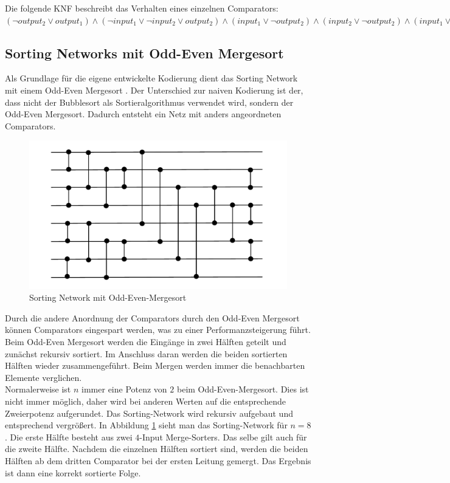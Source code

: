 \documentclass[a4,abstract=on]{scrartcl}
\begin{document}
Die folgende KNF beschreibt das Verhalten eines einzelnen Comparators:\\
$(\neg output_2 \vee output_1) \wedge (\neg input_1 \vee \neg input_2 \vee output_2) \wedge (input_1 \vee \neg output_2) \wedge (input_2 \vee \neg output_2) \wedge (input_1 \vee input_2 \vee \neg output_1) \wedge (\neg input_1 \vee output_1) \wedge (\neg input_2 \vee output_1)$

	\subsection{Sorting Networks mit Odd-Even Mergesort}
Als Grundlage für die eigene entwickelte Kodierung dient das Sorting Network mit einem Odd-Even Mergesort \cite[vgl.][]{odd-even}. Der Unterschied zur naiven Kodierung ist der, dass nicht der Bubblesort als Sortieralgorithmus verwendet wird, sondern der Odd-Even Mergesort. Dadurch entsteht ein Netz mit anders angeordneten Comparators.

\begin{figure}[H]
\centering
\includegraphics[width=\textwidth]{sorting_network_odd_even.pdf}
\caption{Sorting Network mit Odd-Even-Mergesort}
\label{fig:odd-even-mergesort}
\end{figure}

Durch die andere Anordnung der Comparators durch den Odd-Even Mergesort können Comparators eingespart werden, was zu einer Performanzsteigerung führt. Beim Odd-Even Mergesort werden die Eingänge in zwei Hälften geteilt und zunächst rekursiv sortiert. Im Anschluss daran werden die beiden sortierten Hälften wieder zusammengeführt. Beim Mergen werden immer die benachbarten Elemente verglichen.\\
Normalerweise ist $n$ immer eine Potenz von $2$ beim Odd-Even-Mergesort. Dies ist nicht immer möglich, daher wird bei anderen Werten auf die entsprechende Zweierpotenz aufgerundet. Das Sorting-Network wird rekursiv aufgebaut und entsprechend vergrößert. In Abbildung \ref{fig:odd-even-mergesort} sieht man das Sorting-Network für $n=8$. Die erste Hälfte besteht aus zwei $4$-Input Merge-Sorters. Das selbe gilt auch für die zweite Hälfte. Nachdem die einzelnen Hälften sortiert sind, werden die beiden Hälften ab dem dritten Comparator bei der ersten Leitung gemergt. Das Ergebnis ist dann eine korrekt sortierte Folge.
\end{document}
